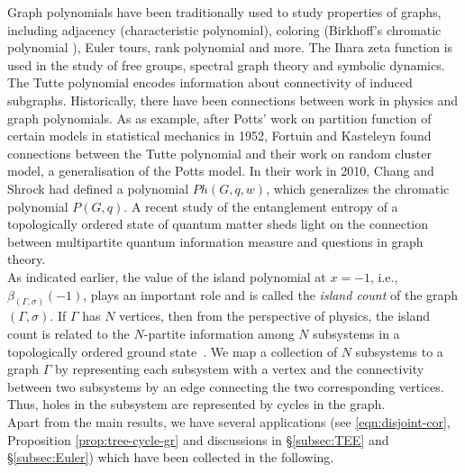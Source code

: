 \documentclass[10pt, reqno]{amsart}
\newcommand{\hf}{\hspace*{0.5cm}}
\theoremstyle{plain}
\theoremstyle{remark}
\theoremstyle{definition}
\numberwithin{equation}{section}
\begin{document}
\hf Graph polynomials have been traditionally used to study properties of graphs, including adjacency (characteristic polynomial), coloring (Birkhoff's chromatic polynomial \cite{Big93}), Euler tours, rank polynomial \cite{GoSo01} and more. The Ihara zeta function \cite{Iha66} is used in the study of free groups, spectral graph theory and symbolic dynamics. The Tutte polynomial \cite{Tut54, Tut67, Bol98} encodes information about connectivity of induced subgraphs. Historically, there have been connections between work in physics and graph polynomials. As as example, after Potts' work \cite{Pot52} on partition function of certain models in statistical mechanics in 1952, Fortuin and Kasteleyn \cite{FoKa72} found connections between the Tutte polynomial and their work on random cluster model, a generalisation of the Potts model. In their work in 2010, Chang and Shrock \cite{ChSh10} had defined a polynomial $Ph(G, q, w)$, which generalizes the chromatic polynomial $P(G,q)$. A recent study \cite{SiddharthaTEE2021} of the entanglement entropy of a topologically ordered state of quantum matter sheds light on the connection between multipartite quantum information measure and questions in graph theory.\\
\hf As indicated earlier, the value of the island polynomial at $x=-1$, i.e., $\beta_{(\Gamma,\sigma)}(-1)$, plays an important role and is called the {\it island count} of the graph $(\Gamma,\sigma)$. If $\Gamma$ has $N$ vertices, then from the perspective of physics, the island count is related to the $N$-partite information among $N$ subsystems in a topologically ordered ground state~\cite{wen2013,wen2017colloquium,wen2019review}. We map a collection of $N$ subsystems to a graph $\Gamma$ by representing each subsystem with a vertex and the connectivity between two subsystems by an edge connecting the two corresponding vertices. Thus, holes in the subsystem are represented by cycles in the graph.\\
\hf Apart from the main results, we have several applications (see \eqref{eqn:disjoint-cor}, Proposition \ref{prop:tree-cycle-gr} and discussions in \S \ref{subsec:TEE} and \S \ref{subsec:Euler}) which have been collected in the following. 
\end{document}
